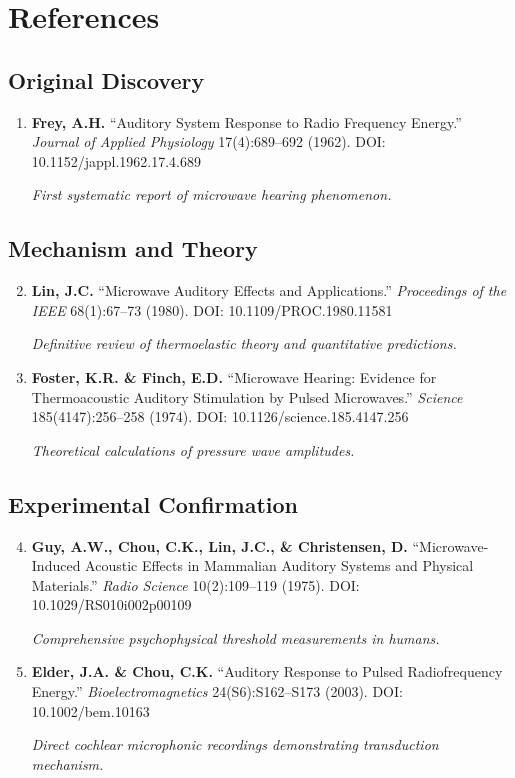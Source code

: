 \section{References}

\subsection*{Original Discovery}

\begin{enumerate}
\item \textbf{Frey, A.H.} ``Auditory System Response to Radio Frequency Energy.'' \emph{Journal of Applied Physiology} 17(4):689--692 (1962). DOI: 10.1152/jappl.1962.17.4.689

\textit{First systematic report of microwave hearing phenomenon.}
\end{enumerate}

\subsection*{Mechanism and Theory}

\begin{enumerate}
\setcounter{enumi}{1}
\item \textbf{Lin, J.C.} ``Microwave Auditory Effects and Applications.'' \emph{Proceedings of the IEEE} 68(1):67--73 (1980). DOI: 10.1109/PROC.1980.11581

\textit{Definitive review of thermoelastic theory and quantitative predictions.}

\item \textbf{Foster, K.R. \& Finch, E.D.} ``Microwave Hearing: Evidence for Thermoacoustic Auditory Stimulation by Pulsed Microwaves.'' \emph{Science} 185(4147):256--258 (1974). DOI: 10.1126/science.185.4147.256

\textit{Theoretical calculations of pressure wave amplitudes.}
\end{enumerate}

\subsection*{Experimental Confirmation}

\begin{enumerate}
\setcounter{enumi}{3}
\item \textbf{Guy, A.W., Chou, C.K., Lin, J.C., \& Christensen, D.} ``Microwave-Induced Acoustic Effects in Mammalian Auditory Systems and Physical Materials.'' \emph{Radio Science} 10(2):109--119 (1975). DOI: 10.1029/RS010i002p00109

\textit{Comprehensive psychophysical threshold measurements in humans.}

\item \textbf{Elder, J.A. \& Chou, C.K.} ``Auditory Response to Pulsed Radiofrequency Energy.'' \emph{Bioelectromagnetics} 24(S6):S162--S173 (2003). DOI: 10.1002/bem.10163

\textit{Direct cochlear microphonic recordings demonstrating transduction mechanism.}
\end{enumerate}


